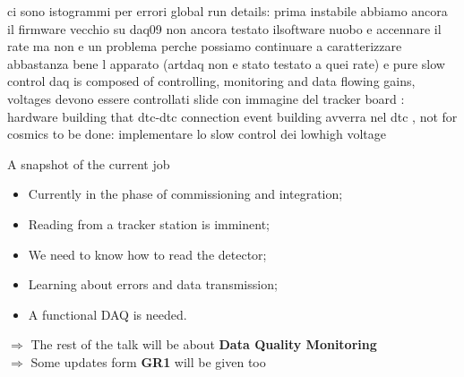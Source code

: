 \documentclass{beamer}[10pt]
\begin{document}
ci sono istogrammi per errori
global run details: prima instabile 
abbiamo ancora il firmware vecchio su daq09
non ancora testato ilsoftware nuobo e accennare il rate ma non e un problema perche possiamo continuare a caratterizzare abbastanza bene l apparato (artdaq non e stato testato a quei rate) e pure slow control
daq is composed of controlling, monitoring and data flowing
gains, voltages devono essere controllati
slide con immagine del tracker board : hardware building that dtc-dtc connection
event building avverra nel dtc , not for cosmics
to be done: implementare lo slow control dei lowhigh voltage
\begin{frame}{A snapshot of the current job}
\vspace{-3mm}
\begin{itemize}
\item Currently in the phase of commissioning and integration;
\vspace{3mm}
\item Reading from a tracker station is imminent;
\vspace{3mm}
\item We need to know how to read the detector;
\vspace{3mm}
\item Learning about errors and data transmission;
\vspace{3mm}
\item A functional DAQ is needed.
\vspace{5mm}
\end{itemize}
$\Rightarrow$ The rest of the talk will be about \textbf{Data Quality Monitoring}
\\
\vspace{5mm}
$\Rightarrow$ Some updates form \textbf{GR1} will be given too
\end{frame}
\end{document}
